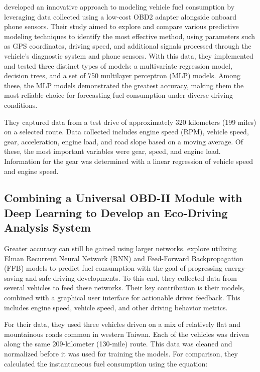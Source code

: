 \documentclass[letterpaper]{article}
\begin{document}
\cite{rykala2023modeling} developed an innovative approach to modeling vehicle fuel
consumption by leveraging data collected using a low-cost OBD2 adapter alongside
onboard phone sensors. Their study aimed to explore and compare various
predictive modeling techniques to identify the most effective method, using
parameters such as GPS coordinates, driving speed, and additional signals
processed through the vehicle's diagnostic system and phone sensors. With this
data, they implemented and tested three distinct types of models: a multivariate
regression model, decision trees, and a set of 750 multilayer perceptron (MLP)
models. Among these, the MLP models demonstrated the greatest accuracy, making
them the most reliable choice for forecasting fuel consumption under diverse
driving conditions. 

They captured data from a test drive of approximately 320
kilometers (199 miles) on a selected route. Data collected includes engine speed
(RPM), vehicle speed, gear, acceleration, engine load, and road slope based on a
moving average. Of these, the most important variables were gear, speed, and
engine load. Information for the gear was determined with a linear regression of
vehicle speed and engine speed.

\subsection*{Combining a Universal OBD-II Module with Deep Learning to Develop
an Eco-Driving Analysis System}

Greater accuracy can still be gained using larger networks. \cite{yen_combining_2021} 
explore utilizing Elman Recurrent Neural Network (RNN) and Feed-Forward Backpropagation
(FFB) models to predict fuel consumption with the goal of progressing
energy-saving and safe-driving developments. To this end, they collected data
from several vehicles to feed these networks. Their key contribution is their
models, combined with a graphical user interface for actionable driver feedback.
This includes engine speed, vehicle speed, and other driving behavior metrics.

For their data, they used three vehicles driven on a mix of relatively flat and
mountainous roads common in western Taiwan. Each of the vehicles was driven
along the same 209-kilometer (130-mile) route. This data was cleaned and
normalized before it was used for training the models. For comparison, they
calculated the instantaneous fuel consumption using the equation: 
\end{document}
